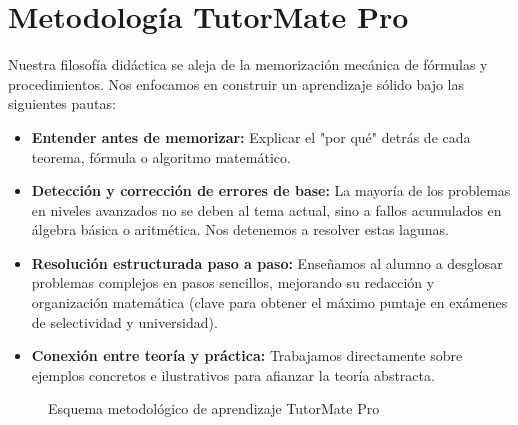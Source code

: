 \documentclass[11pt,a4paper]{article}
\begin{document}
\newpage
\section{Metodología TutorMate Pro}
Nuestra filosofía didáctica se aleja de la memorización mecánica de fórmulas y procedimientos. Nos enfocamos en construir un aprendizaje sólido bajo las siguientes pautas:
\begin{itemize}
    \item \textbf{Entender antes de memorizar:} Explicar el "por qué" detrás de cada teorema, fórmula o algoritmo matemático.
    \item \textbf{Detección y corrección de errores de base:} La mayoría de los problemas en niveles avanzados no se deben al tema actual, sino a fallos acumulados en álgebra básica o aritmética. Nos detenemos a resolver estas lagunas.
    \item \textbf{Resolución estructurada paso a paso:} Enseñamos al alumno a desglosar problemas complejos en pasos sencillos, mejorando su redacción y organización matemática (clave para obtener el máximo puntaje en exámenes de selectividad y universidad).
    \item \textbf{Conexión entre teoría y práctica:} Trabajamos directamente sobre ejemplos concretos e ilustrativos para afianzar la teoría abstracta.
\end{itemize}

\begin{figure}[h]
\centering
{}
\caption{Esquema metodológico de aprendizaje TutorMate Pro}
\label{fig:flujo}
\end{figure}
\end{document}
